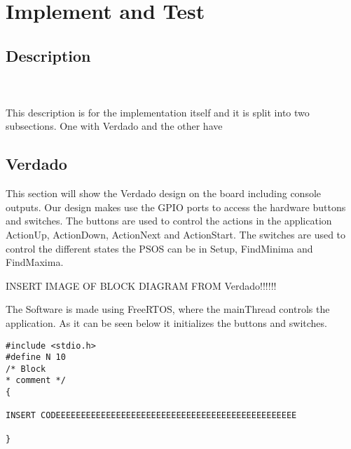 \section{Implement and Test}

\subsection{Description}

\noindent{}
\\\\

This description is for the implementation itself and it is split into two subsections. One with Verdado and the other have 

\subsection{Verdado}
This section will show the Verdado design on the board including console outputs. Our design makes use the GPIO ports to access the hardware buttons and switches. The buttons are used to control the actions in the application ActionUp, ActionDown, ActionNext and ActionStart. The switches are used to control the different states the PSOS can be in Setup, FindMinima and FindMaxima.

INSERT IMAGE OF BLOCK DIAGRAM FROM Verdado!!!!!!

The Software is made using FreeRTOS, where the mainThread controls the application. As it can be seen below it initializes the buttons and switches.

\begin{lstlisting}[style=customc++, label={lst:listingExample}, caption={Example listing.}]
#include <stdio.h>
#define N 10
/* Block
* comment */
{

INSERT CODEEEEEEEEEEEEEEEEEEEEEEEEEEEEEEEEEEEEEEEEEEEEEEEE

}
\end{lstlisting}

